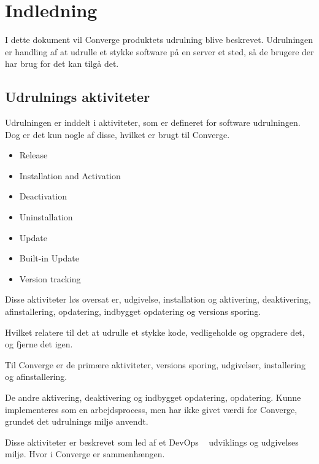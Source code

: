 \chapter{Indledning}

I dette dokument vil Converge produktets udrulning blive beskrevet. Udrulningen er handling af at udrulle et stykke software på en server et sted, så de brugere der har brug for det kan tilgå det.


\section{Udrulnings aktiviteter}

Udrulningen er inddelt i aktiviteter, som er defineret for software udrulningen. Dog er det kun nogle af disse, hvilket er brugt til Converge.

\begin{itemize}
    \item Release
    \item Installation and Activation
    \item Deactivation
    \item Uninstallation
    \item Update
    \item Built-in Update
    \item Version tracking
\end{itemize}

Disse aktiviteter løs oversat er, udgivelse, installation og aktivering, deaktivering, afinstallering, opdatering, indbygget opdatering og versions sporing.

Hvilket relatere til det at udrulle et stykke kode, vedligeholde og opgradere det, og fjerne det igen.

Til Converge er de primære aktiviteter, versions sporing, udgivelser, installering og afinstallering.

De andre aktivering, deaktivering og indbygget opdatering, opdatering. Kunne implementeres som en arbejdsprocess, men har ikke givet værdi for Converge, grundet det udrulnings miljø anvendt.

Disse aktiviteter er beskrevet som led af et DevOps ~\cite{documentation_terms} udviklings og udgivelses miljø. Hvor i Converge er sammenhængen.

